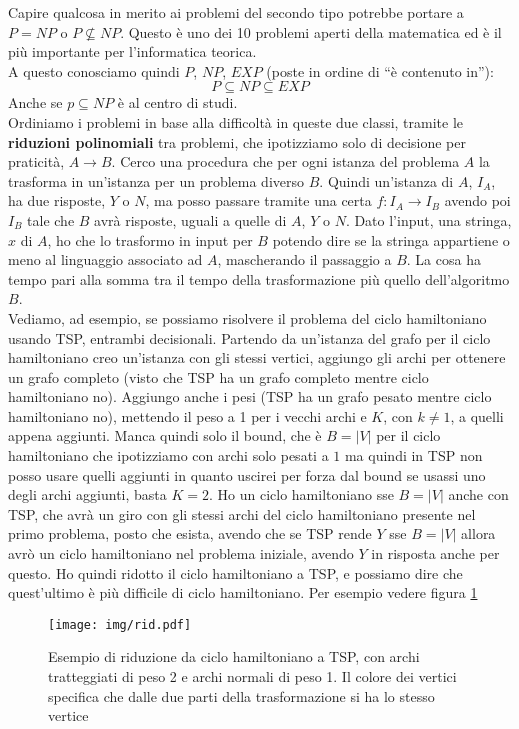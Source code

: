 Capire qualcosa in merito ai problemi del secondo tipo potrebbe portare a $P=NP$
o $P\not\subseteq NP$. Questo è uno dei 10 problemi aperti della matematica ed è
il più importante per l'informatica teorica.\\
A questo conosciamo quindi $P$, $NP$, $EXP$ (poste in ordine di ``è contenuto
in''):
\[P\subseteq NP \subseteq EXP\]
Anche se $p\subseteq NP$ è al centro di studi.\\
Ordiniamo i problemi in base alla difficoltà in queste due classi, tramite le
\textbf{riduzioni polinomiali} tra problemi, che ipotizziamo solo di decisione
per praticità, $A\to B$. Cerco una procedura che per ogni istanza del problema
$A$ la trasforma in un'istanza per un problema diverso $B$. Quindi un'istanza di
$A$, $I_A$, ha due risposte, $Y$ o $N$, ma posso passare tramite una certa
$f:I_A\to I_B$ avendo poi $I_B$ tale che $B$ avrà risposte, uguali a quelle di
$A$, $Y$ o $N$. Dato l'input, una stringa, $x$ di $A$, ho che lo trasformo in
input per $B$ potendo dire se la stringa appartiene o meno al linguaggio
associato ad $A$, mascherando il passaggio a $B$. La cosa ha tempo pari alla
somma tra il tempo della trasformazione più quello dell'algoritmo $B$.\\
Vediamo, ad esempio, se possiamo risolvere il problema del ciclo hamiltoniano
usando TSP, entrambi decisionali. Partendo da un'istanza del grafo per il ciclo
hamiltoniano creo un'istanza con gli stessi vertici, aggiungo gli archi per
ottenere un grafo completo (visto che TSP ha un grafo completo mentre ciclo
hamiltoniano no). Aggiungo anche i pesi (TSP ha un grafo pesato mentre ciclo
hamiltoniano no), mettendo il peso a 1 per i vecchi archi
e $K$, con $k\neq 1$, a quelli appena aggiunti. Manca quindi
solo il bound, che è $B=|V|$ per il ciclo hamiltoniano che ipotizziamo con archi
solo pesati a $1$ ma quindi in TSP non posso usare quelli aggiunti in quanto
uscirei per forza dal bound se usassi uno degli archi aggiunti, basta $K=2$. Ho
un ciclo hamiltoniano sse $B=|V|$ anche con TSP, che avrà un giro con gli stessi
archi del ciclo hamiltoniano presente nel primo problema, posto che esista,
avendo che se TSP rende $Y$ sse $B=|V|$ allora avrò un ciclo hamiltoniano nel
problema iniziale, avendo $Y$ in risposta anche per questo. Ho quindi ridotto il
ciclo hamiltoniano a TSP, e possiamo dire che quest'ultimo è più difficile di
ciclo hamiltoniano. Per esempio vedere figura \ref{fig:htsp}
\begin{figure}
  \centering
  \texttt{[image: img/rid.pdf]}
  \caption{Esempio di riduzione da ciclo hamiltoniano a TSP, con archi
    tratteggiati di peso 2 e archi normali di peso 1. Il colore dei vertici
    specifica che dalle due parti della trasformazione si ha lo stesso vertice}
  \label{fig:htsp}
\end{figure}
